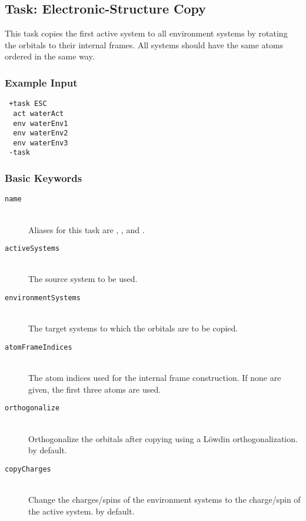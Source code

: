 \subsection{Task: Electronic-Structure Copy}
This task copies the first active system to all environment systems by rotating the
orbitals to their internal frames. All systems should have the same atoms ordered
in the same way.
\subsubsection{Example Input}
\begin{lstlisting}
 +task ESC
  act waterAct
  env waterEnv1
  env waterEnv2
  env waterEnv3
 -task
\end{lstlisting}

\subsubsection{Basic Keywords}
\begin{description}
\item [\texttt{name}]\hfill \\
  Aliases for this task are , , and .
\item [\texttt{activeSystems}]\hfill \\
  The source system to be used.
\item [\texttt{environmentSystems}]\hfill \\
  The target systems to which the orbitals are to be copied.
\item [\texttt{atomFrameIndices}]\hfill \\
  The atom indices used for the internal frame construction.
  If none are given, the first three atoms are used.
\item [\texttt{orthogonalize}]\hfill \\
  Orthogonalize the orbitals after copying using a
  Löwdin orthogonalization.  by default.
\item [\texttt{copyCharges}]\hfill \\
  Change the charges/spins of the environment systems
  to the charge/spin of the active system.  by default.
\end{description}
